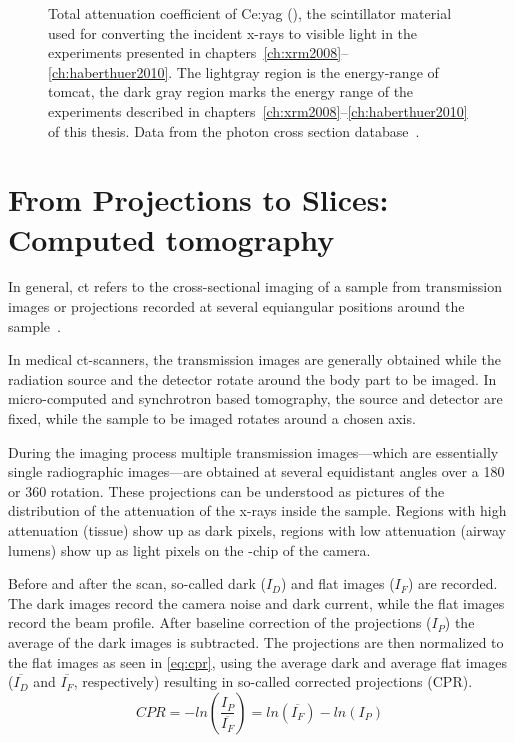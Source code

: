 \def\width{\linewidth}%
\def\height{0.618\linewidth}%
\begin{figure}[htb]%
	\noindent\makebox[\textwidth]{%
		\centering
		}
	\caption[Total attenuation coefficient of Ce:\acs{yag}]{Total attenuation coefficient of Ce:\acs{yag} (), the scintillator material used for converting the incident x-rays to visible light in the experiments presented in chapters~\ref{ch:xrm2008}--\ref{ch:haberthuer2010}. The lightgray region is the energy-range of \ac{tomcat}, the dark gray region marks the energy range of the experiments described in chapters~\autoref{ch:xrm2008}--\ref{ch:haberthuer2010} of this thesis. Data from the photon cross section database~\cite{XCOM}.}
	\label{fig:yag attenuation}
\end{figure}%

\section{From Projections to Slices: Computed tomography}
In general, \ac{ct} refers to the cross-sectional imaging of a sample from transmission images or projections recorded at several equiangular positions around the sample~\cite{Kak2002}.

In medical \ac{ct}-scanners, the transmission images are generally obtained while the radiation source and the detector rotate around the body part to be imaged. In micro-computed and synchrotron based tomography, the source and detector are fixed, while the sample to be imaged rotates around a chosen axis.

During the imaging process multiple transmission images---which are essentially single radiographic images---are obtained at several equidistant angles over a \unit{180}{\degree} or \unit{360}{\degree} rotation. These projections can be understood as pictures of the distribution of the attenuation of the x-rays inside the sample. Regions with high attenuation (\eg tissue) show up as dark pixels, regions with low attenuation (\eg airway lumens) show up as light pixels on the -chip of the camera.

Before and after the scan, so-called dark ($I_{D}$) and flat images ($I_{F}$) are recorded. The dark images record the camera noise and dark current, while the flat images record the beam profile. After baseline correction of the projections ($I_{P}$) the average of the dark images is subtracted. The projections are then normalized to the flat images as seen in \autoref{eq:cpr}, using the average dark and average flat images ($\overline{I_{D}}$ and $\overline{I_{F}}$, respectively) resulting in so-called corrected projections (CPR).%
\begin{equation}%
	CPR=-ln\left(\frac{I_{P}}{\overline{I_{F}}}\right)=ln(\overline{I_{F}})-ln(I_{P})%
	\label{eq:cpr}%
\end{equation}%

